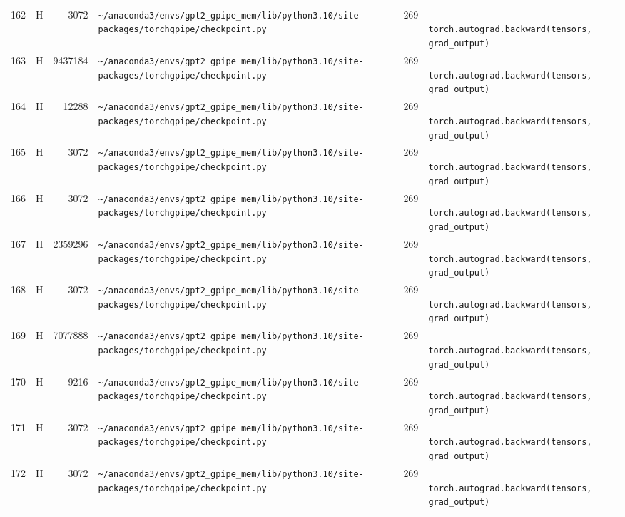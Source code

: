 \documentclass{article}
\begin{document}
\begin{longtable}{r l r p{6.5cm} r p{7.0cm}}
162 & H & 3072 & \lstinline|~/anaconda3/envs/gpt2_gpipe_mem/lib/python3.10/site-packages/torchgpipe/checkpoint.py| & 269 & \lstinline|            torch.autograd.backward(tensors, grad_output)| \\
163 & H & 9437184 & \lstinline|~/anaconda3/envs/gpt2_gpipe_mem/lib/python3.10/site-packages/torchgpipe/checkpoint.py| & 269 & \lstinline|            torch.autograd.backward(tensors, grad_output)| \\
164 & H & 12288 & \lstinline|~/anaconda3/envs/gpt2_gpipe_mem/lib/python3.10/site-packages/torchgpipe/checkpoint.py| & 269 & \lstinline|            torch.autograd.backward(tensors, grad_output)| \\
165 & H & 3072 & \lstinline|~/anaconda3/envs/gpt2_gpipe_mem/lib/python3.10/site-packages/torchgpipe/checkpoint.py| & 269 & \lstinline|            torch.autograd.backward(tensors, grad_output)| \\
166 & H & 3072 & \lstinline|~/anaconda3/envs/gpt2_gpipe_mem/lib/python3.10/site-packages/torchgpipe/checkpoint.py| & 269 & \lstinline|            torch.autograd.backward(tensors, grad_output)| \\
167 & H & 2359296 & \lstinline|~/anaconda3/envs/gpt2_gpipe_mem/lib/python3.10/site-packages/torchgpipe/checkpoint.py| & 269 & \lstinline|            torch.autograd.backward(tensors, grad_output)| \\
168 & H & 3072 & \lstinline|~/anaconda3/envs/gpt2_gpipe_mem/lib/python3.10/site-packages/torchgpipe/checkpoint.py| & 269 & \lstinline|            torch.autograd.backward(tensors, grad_output)| \\
169 & H & 7077888 & \lstinline|~/anaconda3/envs/gpt2_gpipe_mem/lib/python3.10/site-packages/torchgpipe/checkpoint.py| & 269 & \lstinline|            torch.autograd.backward(tensors, grad_output)| \\
170 & H & 9216 & \lstinline|~/anaconda3/envs/gpt2_gpipe_mem/lib/python3.10/site-packages/torchgpipe/checkpoint.py| & 269 & \lstinline|            torch.autograd.backward(tensors, grad_output)| \\
171 & H & 3072 & \lstinline|~/anaconda3/envs/gpt2_gpipe_mem/lib/python3.10/site-packages/torchgpipe/checkpoint.py| & 269 & \lstinline|            torch.autograd.backward(tensors, grad_output)| \\
172 & H & 3072 & \lstinline|~/anaconda3/envs/gpt2_gpipe_mem/lib/python3.10/site-packages/torchgpipe/checkpoint.py| & 269 & \lstinline|            torch.autograd.backward(tensors, grad_output)| \\

\end{longtable}
\end{document}
